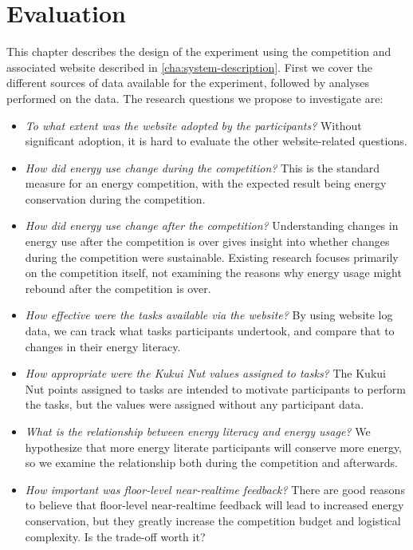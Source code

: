 \chapter{Evaluation}
\label{cha:evaluation}

This chapter describes the design of the experiment using the competition and associated website described in \autoref{cha:system-description}. First we cover the different sources of data available for the experiment, followed by analyses performed on the data. The research questions we propose to investigate are:

\begin{itemize}
	\item \emph{To what extent was the website adopted by the participants?} Without significant adoption, it is hard to evaluate the other website-related questions.
	\item \emph{How did energy use change during the competition?} This is the standard measure for an energy competition, with the expected result being energy conservation during the competition.
	\item \emph{How did energy use change after the competition?} Understanding changes in energy use after the competition is over gives insight into whether changes during the competition were sustainable. Existing research focuses primarily on the competition itself, not examining the reasons why energy usage might rebound after the competition is over.
	\item \emph{How effective were the tasks available via the website?} By using website log data, we can track what tasks participants undertook, and compare that to changes in their energy literacy.
	\item \emph{How appropriate were the Kukui Nut values assigned to tasks?} The Kukui Nut points assigned to tasks are intended to motivate participants to perform the tasks, but the values were assigned without any participant data.
	\item \emph{What is the relationship between energy literacy and energy usage?} We hypothesize that more energy literate participants will conserve more energy, so we examine the relationship both during the competition and afterwards.
	\item \emph{How important was floor-level near-realtime feedback?} There are good reasons to believe that floor-level near-realtime feedback will lead to increased energy conservation, but they greatly increase the competition budget and logistical complexity. Is the trade-off worth it?
\end{itemize}

